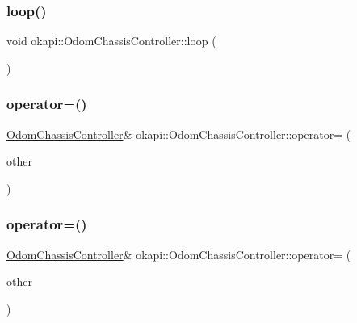 \subsubsection{\texorpdfstring{loop()}{loop()}}
{\footnotesize\ttfamily void okapi\+::\+Odom\+Chassis\+Controller\+::loop (\begin{DoxyParamCaption}{ }\end{DoxyParamCaption})\hspace{0.3cm}{\ttfamily [protected]}}

\mbox{\label{classokapi_1_1OdomChassisController_abf1d2bbcacf41866867e03e7bdd68f06}} 
\subsubsection{\texorpdfstring{operator=()}{operator=()}\hspace{0.1cm}{\footnotesize\ttfamily [1/2]}}
{\footnotesize\ttfamily \mbox{\hyperlink{classokapi_1_1OdomChassisController}{Odom\+Chassis\+Controller}}\& okapi\+::\+Odom\+Chassis\+Controller\+::operator= (\begin{DoxyParamCaption}\item[{const \mbox{\hyperlink{classokapi_1_1OdomChassisController}{Odom\+Chassis\+Controller}} \&}]{other }\end{DoxyParamCaption})\hspace{0.3cm}{\ttfamily [delete]}}

\mbox{\label{classokapi_1_1OdomChassisController_ab0f6b3231dde46d04d570ec31caf7495}} 
\subsubsection{\texorpdfstring{operator=()}{operator=()}\hspace{0.1cm}{\footnotesize\ttfamily [2/2]}}
{\footnotesize\ttfamily \mbox{\hyperlink{classokapi_1_1OdomChassisController}{Odom\+Chassis\+Controller}}\& okapi\+::\+Odom\+Chassis\+Controller\+::operator= (\begin{DoxyParamCaption}\item[{\mbox{\hyperlink{classokapi_1_1OdomChassisController}{Odom\+Chassis\+Controller}} \&\&}]{other }\end{DoxyParamCaption})\hspace{0.3cm}{\ttfamily [delete]}}

